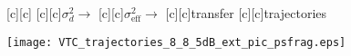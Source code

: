 \documentclass{article}
\begin{document}
\begin{figure}[htb]
  \begin{center}

        [c][c]{}
        [c][c]{$\sigma_d^2\rightarrow$}
        [c][c]{$\sigma_{\mathrm{eff}}^2 \rightarrow$}
	[c]{transfer}
        [c][c]{trajectories}


    \texttt{[image: VTC\_trajectories\_8\_8\_5dB\_ext\_pic\_psfrag.eps]}
    \end{center}
\end{figure}
\end{document}
